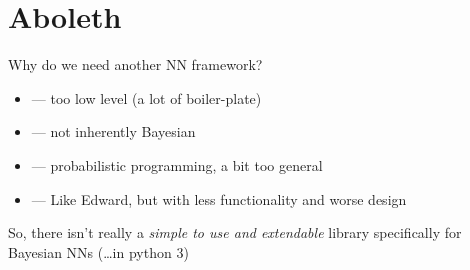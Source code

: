 \documentclass[lualatex, aspectratio=169]{beamer}
\begin{document}
\section{Aboleth}

\begin{frame}{Why do we need another NN framework?}

  \begin{itemize}
    \item {} --- too low level (a lot of boiler-plate)
    \item {} --- not inherently Bayesian
    \item {} --- probabilistic programming, a bit too general
    \item {} --- Like Edward, but with less functionality and worse design
  \end{itemize}

  \hspace{1cm}

  So, there isn't really a \emph{simple to use and extendable} library specifically for Bayesian NNs (\ldots in python 3)

\end{frame}
\end{document}

